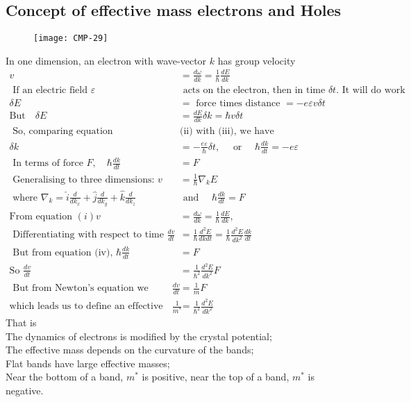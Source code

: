 \subsection{Concept of effective mass electrons and Holes}
\begin{figure}[H]
	\centering
	\texttt{[image: CMP-29]}
	\caption{}
	\label{}
\end{figure}
In one dimension, an electron with wave-vector $k$ has group velocity
\begin{align*}
v&=\frac{d \omega}{d k}=\frac{1}{\hbar} \frac{d E}{d k}\\
\text { If an electric field } \varepsilon &\text { acts on the electron, then in time } \delta t \text {. It will do work }\\
\delta E&=\text { force times distance }=-e \varepsilon v \delta t \\
\text{But}\quad \delta E&=\frac{d E}{d k} \delta k=\hbar v \delta t\\
\text { So, comparing equation  }&\text{(ii) with (iii), we have}\\
\delta k&=-\frac{e \varepsilon}{\hbar} \delta t, \quad \text { or } \quad \hbar \frac{d k}{d t}=-e \varepsilon\\
\text { In terms of force } F, \quad \hbar \frac{d k}{d t}&=F\\
\text { Generalising to three dimensions: } v&=\frac{1}{\hbar} \nabla_{k} E\\
\text { where } \nabla_{k}=\hat{i} \frac{d}{d k_{x}}+\hat{j} \frac{d}{d k_{y}}+\hat{k} \frac{d}{d k_{z}} \quad &\text { and } \quad \hbar \frac{d k}{d t}=F\\
\text{From equation }
(i) v&=\frac{d \omega}{d k}=\frac{1}{\hbar} \frac{d E}{d k},\\
\text { Differentiating with respect to time } \frac{d v}{d t}&=\frac{1}{\hbar} \frac{d^{2} E}{d k d t}=\frac{1}{\hbar} \frac{d^{2} E}{d k^{2}} \frac{d k}{d t}\\
\text { But from equation (iv), } \hbar \frac{d k}{d t}&=F\\
\text{So }
\frac{d v}{d t}&=\frac{1}{\hbar^{2}} \frac{d^{2} E}{d k^{2}} F\\
\text { But from Newton's equation we expect } \frac{d v}{d t}&=\frac{1}{m} F\\
\text{which leads us to define an effective mass }
\frac{1}{m^{*}}&=\frac{1}{\hbar^{2}} \frac{d^{2} E}{d k^{2}}
\end{align*}
That is\\
The dynamics of electrons is modified by the crystal potential;\\
The effective mass depends on the curvature of the bands;\\
Flat bands have large effective masses;\\
Near the bottom of a band, $m^{*}$ is positive, near the top of a band, $m^{*}$ is negative.\\
